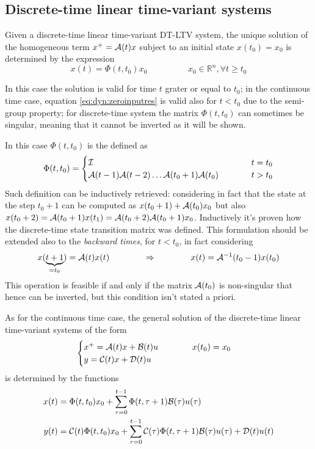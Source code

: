 	\subsection*{Discrete-time linear time-variant systems}
	Given a discrete-time linear time-variant DT-LTV system, the unique solution of the homogeneous term $x^+ = \mathcal{A}(t) x$ subject to an initial state $x(t_0) = x_0$ is determined by the expression
	\begin{equation}
		x(t) = \Phi(t,t_0) x_0 \hspace{2cm} x_0 \in \mathds R^n, \forall t \geq t_0
	\end{equation}
	\begin{note}
		In this case the solution is valid for time $t$ grater or equal to $t_0$; in the continuous time case, equation \ref{eq:dyn:zeroinputres} is valid also for $t < t_0$ due to the semi-group property; for discrete-time system the matrix $\Phi(t,t_0)$ can sometimes be singular, meaning that it cannot be inverted as it will be shown.
	\end{note} \noindent
	In this case $\Phi(t,t_0)$ is the  defined as
	\begin{equation} \label{eq:dyn:peanodiscrete}
		\Phi(t,t_0) = \begin{cases}
			\mathcal{I} & t = t_0 \\
			\mathcal{A}(t-1) \mathcal{A}(t-2) \dots \mathcal{A}(t_0+1) \mathcal{A}(t_0) \hspace{1cm} & t > t_0
		\end{cases}
	\end{equation}
	Such definition can be inductively retrieved: considering in fact that the state at the step $t_0+1$ can be computed as $x(t_0 + 1) + \mathcal{A}(t_0) x_0$ but also $x(t_0 + 2) = \mathcal{A}(t_0+1) x(t_1) = \mathcal{A}(t_0+2) \mathcal{A}(t_0+1) x_0$. Inductively it's proven how the discrete-time state transition matrix was defined. This formulation should be extended also to the \textit{backward times}, for $t < t_0$, in fact considering
	\[ x(\underbrace{t+1}_{=t_0}) = \mathcal{A}(t) x(t) \hspace{1.4cm} \Rightarrow \hspace{1.4cm} x(t) = \mathcal{A}^{-1}(t_0 - 1) x(t_0) \]
	This operation is feasible if and only if the matrix $\mathcal{A}(t_0)$ is non-singular that hence can be inverted, but this condition isn't stated a priori.
	
	As for the continuous time case, the general solution of the discrete-time linear time-variant systems of the form
	\[ \begin{cases}
		x^+ = \mathcal{A}(t) x + \mathcal{B}(t) u \hspace{1.4cm} x(t_0) = x_0\\ 
		y = \mathcal{C}(t) x + \mathcal{D}(t) u
	\end{cases} \]
	is determined by the functions
	\begin{equation}
	\begin{split}
		x(t) & = \Phi(t,t_0) x_0 + \sum_{\tau=0}^{t-1} \Phi(t,\tau+1) \mathcal{B}(\tau) u(\tau) \\
		y(t) & =  \mathcal{C}(t) \Phi(t,t_0) x_0 + \sum_{\tau=0}^{t-1} \mathcal{C}(\tau) \Phi(t,\tau+1) \mathcal{B}(\tau) u(\tau)  + \mathcal{D}(t)u(t)
	\end{split}
	\end{equation}

